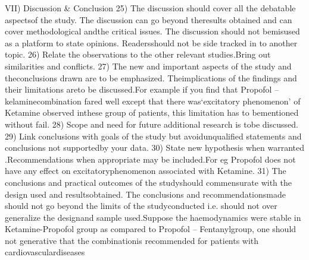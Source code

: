 VII) Discussion & Conclusion
25) The discussion should cover all the debatable  aspectsof the study. The discussion  can go beyond theresults obtained and can cover methodological andthe critical issues. The discussion should not bemisused as a platform to state opinions. Readersshould not be side tracked in to another topic.
26) Relate the observations to the other relevant studies.Bring out similarities and conflicts.
27) The new and important aspects of the study and theconclusions drawn are to be emphasized.  Theimplications  of the findings and their limitations areto be discussed.For example if you find that  Propofol – kelaminecombination fared well except that there was‘excitatory phenomenon’ of Ketamine observed inthese group of patients, this limitation has to bementioned without fail.
28) Scope  and need for future additional research is tobe  discussed.
29) Link conclusions with goals of the study but avoidunqualified statements and conclusions not supportedby your data.
30) State new hypothesis when warranted .Recommendations when appropriate may be included.For eg Propofol does not have any effect on excitatoryphenomenon associated with Ketamine.
31) The conclusions and practical outcomes of the studyshould commensurate with the design used and resultsobtained.  The conclusions and recommendationsmade should not go beyond the limits of the studyconducted i.e. should not over generalize the designand sample used.Suppose the haemodynamics were stable in Ketamine-Propofol group as compared to Propofol – Fentanylgroup, one should not generative that the combinationis recommended for patients with cardiovasculardiseases



